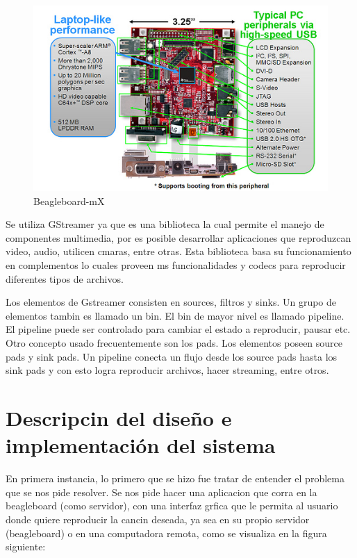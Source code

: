 \documentclass[%
	final,
	reprint,
	notitlepage,
	narroweqnarray,
	inline,
	twoside,
        invited,
	]{ieee}
\begin{document}
\begin{figure}[hbtp]
\includegraphics[scale=0.5]{beagleboard.jpg}
\caption{Beagleboard-mX}
\end{figure}


Se utiliza GStreamer ya que es una biblioteca la cual permite el manejo de componentes multimedia, por es posible desarrollar aplicaciones que reproduzcan video, audio, utilicen cmaras, entre otras. Esta biblioteca basa su funcionamiento en complementos lo cuales proveen ms funcionalidades y codecs para reproducir diferentes tipos de archivos.

Los elementos de Gstreamer consisten en sources, filtros y sinks. Un grupo de elementos tambin es llamado un bin. El bin de mayor nivel es llamado pipeline. El pipeline puede ser controlado para  cambiar el estado a reproducir, pausar etc. Otro concepto usado frecuentemente son los pads. Los elementos poseen source pads y sink pads. Un pipeline conecta un flujo desde los source pads hasta los sink pads  y con esto logra reproducir archivos, hacer streaming, entre otros.
\section{Descripcin del diseño e implementación del sistema}

En primera instancia, lo  primero que se hizo fue tratar de entender el problema que se nos pide resolver. Se nos pide hacer una aplicacion que corra en la beagleboard (como servidor), con una interfaz grfica que le permita al usuario donde quiere reproducir la cancin deseada, ya sea en su propio servidor (beagleboard) o en una computadora remota, como se visualiza en la figura siguiente:
\end{document}
